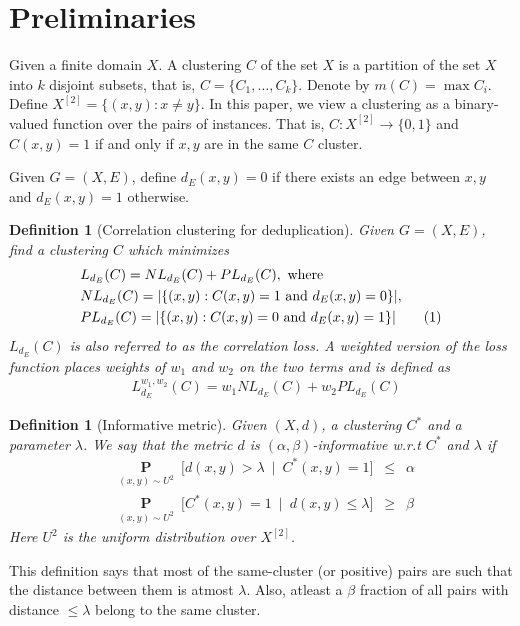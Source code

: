 \documentclass[12pt]{article}
\newtheorem{definition}[theorem]{Definition}
\newcommand{\mb}{\mathbf}
\newcommand\numberthis{\addtocounter{equation}{1}\tag{\theequation}}
\begin{document}
\section{Preliminaries}
\label{section:problemFormulation}
Given a finite domain $X$. A clustering $C$ of the set $X$ is a partition of the set $X$ into $k$ disjoint subsets, that is, $C = \{C_1, \ldots, C_k\}$. Denote by $m(C) = \max C_i$. Define $X^{[2]} = \{(x, y) : x \neq y\}$. In this paper, we view a clustering as a binary-valued function over the pairs of instances. That is, $C: X^{[2]} \rightarrow \{0, 1\}$ and $C(x, y) = 1$ if and only if $x, y$ are in the same $C$ cluster. 

Given $G = (X, E)$, define $d_E(x, y) = 0$ if there exists an edge between $x, y$ and $d_E(x, y) = 1$ otherwise. 

\begin{definition}[Correlation clustering for deduplication]\cite{bansal2004correlation}
Given $G = (X, E)$, find a clustering $C$ which minimizes 
\begin{align*}
  &L_{d_E}(C) = NL_{d_E}(C) + PL_{d_E}(C), \text{ where}\\
  &NL_{d_E}(C) = |\{(x, y): C(x, y) = 1 \text{ and } d_E(x, y) = 0\}|,\\ 
  &PL_{d_E}(C) = |\{(x, y): C(x, y) = 0 \text{ and } d_E(x, y) = 1\}| \numberthis\label{eqn:correlationLoss}
\end{align*}
$L_{d_E}(C)$ is also referred to as the correlation loss. A weighted version of the loss function places weights of $w_1$ and $w_2$ on the two terms and is defined as 
\begin{align}
  &L_{d_E}^{w_1, w_2}(C) = w_1 NL_{d_E}(C) + w_2 PL_{d_E}(C)\label{eqn:weightedCorrelationLoss}
\end{align}
\end{definition}

\begin{definition}[Informative metric]
\label{defn:informativeMetric}
Given $(X, d)$, a clustering $C^*$ and a parameter $\lambda$. We say that the metric $d$ is $(\alpha, \beta)$-informative w.r.t $C^*$ and $\lambda$ if
\begin{align}
	&\underset{(x, y) \sim U^2}{\mb P}\enspace \big[d(x, y) > \lambda \enspace|\enspace C^*(x, y) = 1\big] \enspace \le \enspace \alpha \label{eqn:alphaInformative}\\
	&\underset{(x, y) \sim U^2}{\mb P}\enspace \big[C^*(x, y) = 1 \enspace|\enspace d(x, y) \le \lambda \big] \enspace \ge \enspace \beta \label{eqn:betaInformative}
\end{align}
Here $U^2$ is the uniform distribution over $X^{[2]}$. 
\end{definition} 
This definition says that most of the same-cluster (or positive) pairs are such that the distance between them is atmost $\lambda$. Also, atleast a $\beta$ fraction of all pairs with distance $\le \lambda$ belong to the same cluster. 
\end{document}
